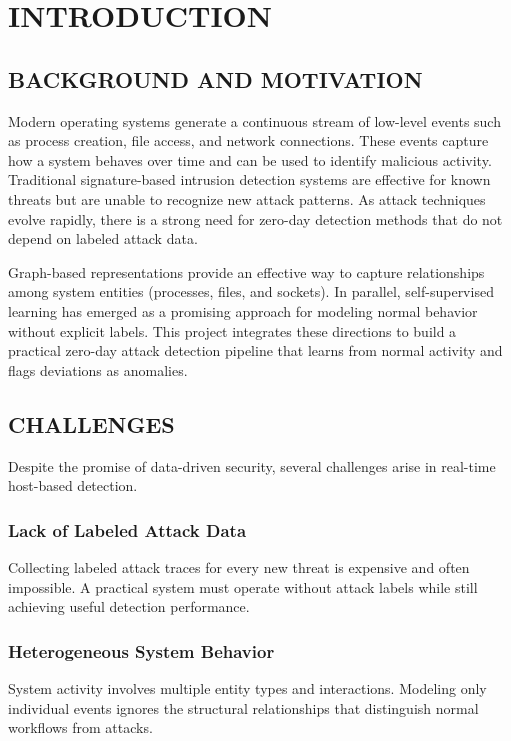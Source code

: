 \chapter{INTRODUCTION}
\label{ch:Introduction}

\section{BACKGROUND AND MOTIVATION}
Modern operating systems generate a continuous stream of low-level events such as
process creation, file access, and network connections. These events capture how a
system behaves over time and can be used to identify malicious activity. Traditional
signature-based intrusion detection systems are effective for known threats but are
unable to recognize new attack patterns. As attack techniques evolve rapidly, there
is a strong need for zero-day detection methods that do not depend on labeled attack
data.

Graph-based representations provide an effective way to capture relationships among
system entities (processes, files, and sockets). In parallel, self-supervised learning
has emerged as a promising approach for modeling normal behavior without explicit
labels. This project integrates these directions to build a practical zero-day attack
detection pipeline that learns from normal activity and flags deviations as anomalies.

\section{CHALLENGES}
Despite the promise of data-driven security, several challenges arise in real-time
host-based detection.

\subsection{Lack of Labeled Attack Data}
Collecting labeled attack traces for every new threat is expensive and often
impossible. A practical system must operate without attack labels while still
achieving useful detection performance.

\subsection{Heterogeneous System Behavior}
System activity involves multiple entity types and interactions. Modeling only
individual events ignores the structural relationships that distinguish normal
workflows from attacks.


